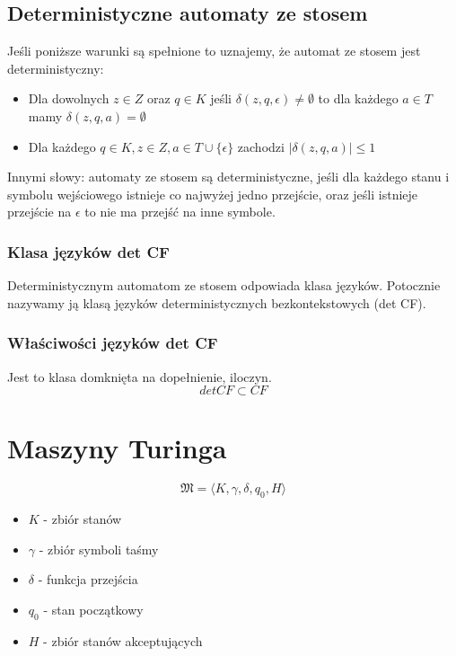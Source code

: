 \documentclass{../notatki}
\begin{document}
\subsection{Deterministyczne automaty ze stosem}

Jeśli poniższe warunki są spełnione to uznajemy, że automat ze stosem jest
deterministyczny:

\begin{itemize}
  \item Dla dowolnych $z \in Z$ oraz $q \in K$ jeśli $\delta(z, q,
    \epsilon) \ne \emptyset$ to dla każdego $a \in T$ mamy $\delta(z, q,
    a) = \emptyset$
  \item Dla każdego $q \in K, z \in Z, a \in T \cup \{\epsilon\}$ zachodzi
    $|\delta(z, q, a)| \le 1$
\end{itemize}
Innymi słowy: automaty ze stosem są deterministyczne, jeśli dla każdego
stanu i symbolu wejściowego istnieje co najwyżej jedno przejście, oraz jeśli
istnieje przejście na $\epsilon$ to nie ma przejść na inne symbole.

\subsubsection{Klasa języków det CF}

Deterministycznym automatom ze stosem odpowiada klasa języków.
Potocznie nazywamy ją klasą języków deterministycznych
bezkontekstowych (det CF).

\subsubsection{Właściwości języków det CF}

Jest to klasa domknięta na dopełnienie, iloczyn.
$$
det CF \subset CF
$$

\section{Maszyny Turinga}
\label{sec:maszyny-turinga}

$$
\mathfrak{M} = \langle K, \gamma, \delta, q_0, H \rangle
$$

\begin{itemize}
  \item $K$ - zbiór stanów
  \item $\gamma$ - zbiór symboli taśmy
  \item $\delta$ - funkcja przejścia
  \item $q_0$ - stan początkowy
  \item $H$ - zbiór stanów akceptujących
\end{itemize}
\end{document}
